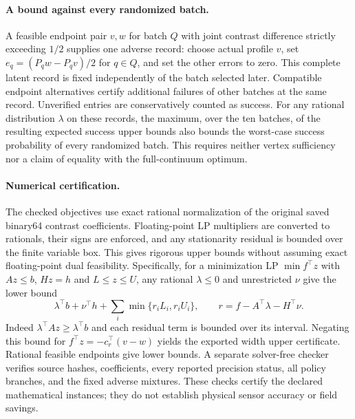 \paragraph{A bound against every randomized batch.}
A feasible endpoint pair $v,w$ for batch $Q$ with joint contrast difference
strictly exceeding $1/2$ supplies one adverse record: choose actual profile
$v$, set $e_q=(P_qw-P_qv)/2$ for $q\in Q$, and set the other errors to zero.
This complete latent record is fixed independently of the batch selected
later.  Compatible endpoint alternatives certify additional failures of
other batches at the same record.  Unverified entries are conservatively
counted as success.  For any rational distribution $\lambda$ on these
records, the maximum, over the ten batches, of the resulting expected
success upper bounds also bounds the worst-case success probability of
every randomized batch.  This requires neither vertex sufficiency nor a
claim of equality with the full-continuum optimum.

\paragraph{Numerical certification.}
The checked objectives use exact rational normalization of the original
saved binary64 contrast coefficients.  Floating-point LP multipliers are
converted to rationals, their signs are enforced, and any stationarity
residual is bounded over the finite variable box.  This gives rigorous
upper bounds without assuming exact floating-point dual feasibility.
Specifically, for a minimization LP $\min f^\top z$ with $Az\leq b$,
$Hz=h$ and $L\leq z\leq U$, any rational $\lambda\leq0$ and unrestricted
$\nu$ give the lower bound
\[
 \lambda^\top b+\nu^\top h+
 \sum_i\min\{r_iL_i,r_iU_i\},\qquad
 r=f-A^\top\lambda-H^\top\nu.
\]
Indeed $\lambda^\top Az\geq\lambda^\top b$ and each residual term is
bounded over its interval.  Negating this bound for
$f^\top z=-c_r^\top(v-w)$ yields the exported width upper certificate.
Rational feasible endpoints give lower bounds.  A separate solver-free
checker verifies source hashes, coefficients, every reported precision
status, all policy branches, and the fixed adverse mixtures.  These checks
certify the declared mathematical instances; they do not establish physical
sensor accuracy or field savings.
